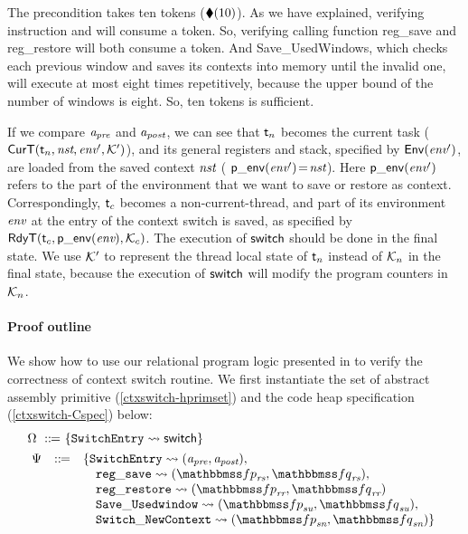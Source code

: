 The precondition takes ten tokens ($\blacklozenge({10})$). 
As we have explained, verifying instruction \call{} 
and \jmp{} will consume a token. 
So, verifying calling function
\textsf{reg\_save} and \textsf{reg\_restore} will 
both consume a token. And \textsf{Save\_UsedWindows}, 
which checks each previous window 
and saves its contexts into memory until the invalid one, 
will execute at most eight times repetitively, 
because the upper bound of 
the number of windows is eight. 
So, ten tokens is sufficient. 

If we compare $\textit{a}_\textit{pre}$ and $\textit{a}_\textit{post}$, we can see that
$\textsf{t}_n$ becomes the current task
($\textsf{CurT}({\textsf{t}_n}, {\textit{nst}}, {\textit{env}'}, {\mathcal{K}'})$),
and its general registers and stack, specified by
$\mathsf{Env}({\textit{env}'})$, are loaded from the saved context
$\textit{nst}$ (\ie{} $\mathsf{p\_env}({\textit{env}'})\!=\!\textit{nst}$).
Here $\mathsf{p\_env}({\textit{env}'})$ refers to the part of the environment
that we want to save or restore as context.
Correspondingly, $\textsf{t}_c$ becomes a non-current-thread,
and part of its environment $\textit{env}$ at the entry of
the context switch is saved, as specified by
$\textsf{RdyT}({\textsf{t}_c}, {\mathsf{p\_env}({\textit{env}})}, {\mathcal{K}_c})$. 
The execution of $\mathsf{switch}$ should be done in the final state. 
We use $\mathcal{K}'$ to represent the thread local 
state of $\textsf{t}_n$ instead of $\mathcal{K}_n$ 
in the final state, because the execution of 
$\mathsf{switch}$ will modify the program counters 
in $\mathcal{K}_n$. 

\paragraph{\textbf{Proof outline}} We show how to use 
our relational program logic presented in 
\Fig{\ref{fig:Selected Inference Rules for Refinement Verification}} 
to verify the correctness of context switch routine. 
We first instantiate the set of 
abstract assembly primitive (\ref{ctxswitch-hprimset})
and the code heap specification (\ref{ctxswitch-Cspec})
below:
\begin{align}
    & \hprimset \ \define \ \{ \SwitchEntry \leadsto 
        \primsw \} 
        \label{ctxswitch-hprimset} \\
    & \!\begin{array}{lcl}
        \Cspec & \define & 
        \{ \SwitchEntry \leadsto (\Apre, \Apost), \\
        & & \quad
        \regsave \leadsto 
        (\relspecpre_{\textit{rs}}, \relspecpost_{\textit{rs}}),\\
        & & \quad
        \regrestore \leadsto
        (\relspecpre_{\textit{rr}}, \relspecpost_{\textit{rr}}) \\
        & & \quad
        \SaveUsedWin{} \leadsto (\relspecpre_{\textit{su}}, \relspecpost_{\textit{su}}), \\
        & & \quad
        \SwitchNewTask{} \leadsto (\relspecpre_{\textit{sn}}, \relspecpost_{\textit{sn}})
        \}
        \label{ctxswitch-Cspec}
    \end{array}
\end{align}

